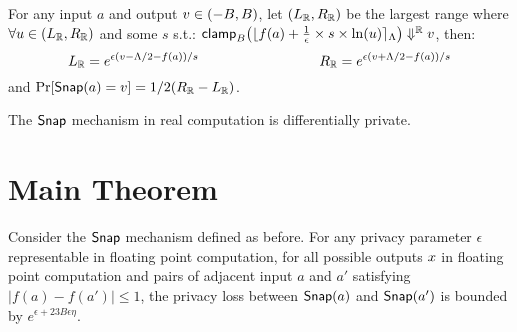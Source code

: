 \documentclass[a4paper,11pt]{article}
\begin{document}
\begin{lem}[idealRL]
\label{lem:idealrl}
For any input $a$ and output $v \in (-B, B)$,
let $(L_{\mathbb{R}}, R_{\mathbb{R}})$ be the largest range where 
$\forall u \in (L_{\mathbb{R}}, R_{\mathbb{R}})$ and some $s$ s.t.:
%
$\mathsf{clamp}_B \big(
	\lfloor f(a) + \frac{1}{\epsilon} \times s \times \ln (u) \rceil_{\Lambda}
	\big)
\Downarrow^{\mathbb{R}} v
$, then:
%
$$
L_{\mathbb{R}} = e^{\epsilon(v - \Lambda/2 - f(a))/s}
~~~~~~~~~~~~~~~~~~~~~~~~~~
R_{\mathbb{R}} = e^{\epsilon(v + \Lambda/2 - f(a))/s}
$$
and 
$\Pr[\mathsf{Snap}(a) = v] = 1/2(R_{\mathbb{R}} - L_{\mathbb{R}})$.
\end{lem}

\begin{lem}[idealDP]
\label{lem:idealdp}
The $\mathsf{Snap}$ mechanism in real computation is differentially private.
\end{lem}

\newpage
\section{Main Theorem}

\begin{thm}
%
Consider the $\mathsf{Snap}$ mechanism defined as before. For any privacy parameter $\epsilon$ representable in floating point computation, for all possible outputs $x$ in floating point computation and pairs of adjacent input $a$ and $a'$ satisfying $|f(a) - f(a')| \leq 1$, the privacy loss between $\mathsf{Snap}(a)$ and $\mathsf{Snap}(a')$ is bounded by $e^{\epsilon + 23 B \epsilon \eta}$.
\end{thm}
\end{document}

